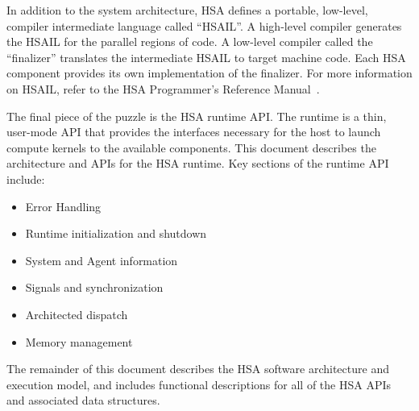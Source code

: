 \documentclass[final]{book}
\begin{document}
In addition to the system architecture, HSA defines a portable, low-level,
compiler intermediate language called ``HSAIL''.  A high-level compiler generates
the HSAIL for the parallel regions of code. A low-level compiler called the
``finalizer'' translates the intermediate HSAIL to target machine code.  Each
HSA component provides its own implementation of the finalizer.  For more
information on HSAIL, refer to the HSA Programmer's Reference Manual~\cite{prm}.

The final piece of the puzzle is the HSA runtime API.  The runtime is a thin,
user-mode API that provides the interfaces necessary for the host to launch
compute kernels to the available components. This document describes the
architecture and APIs for the HSA runtime. Key sections of the runtime API
include:
\begin{itemize}
\item Error Handling
\item Runtime initialization and shutdown
\item System and Agent information
\item Signals and synchronization
\item Architected dispatch
\item Memory management
\end{itemize}

The remainder of this document describes the HSA software architecture and
execution model, and includes functional descriptions for all of the HSA APIs
and associated data structures.
\end{document}
